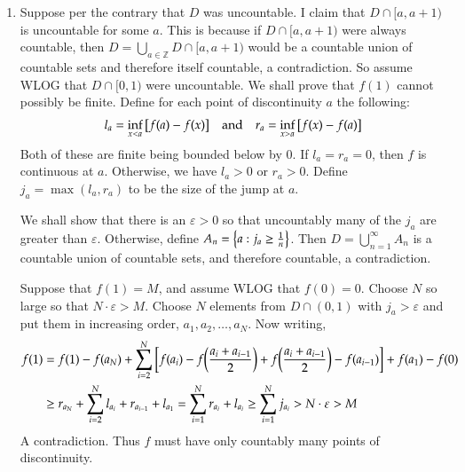 \documentclass[12pt]{article}
\theoremstyle{definitionstyle}
\def\mbb#1{\mathbb{#1}}
\def\ve{\varepsilon}
\newcommand{\SET}[1]{\Set{\mskip-\medmuskip #1 \mskip-\medmuskip}}
\newcommand{\Z}{\mbb Z}
\newcommand{\1}{\mathds 1}
\begin{document}
\begin{enumerate}
        \item Suppose per the contrary that $D$ was uncountable. I claim that $D \cap [a, a+1)$ is uncountable for some $a$. This is because if $D \cap [a, a+1)$ were always countable, then $D = \bigcup_{a \in \Z} D \cap [a, a+1)$ would be a countable union of countable sets and therefore itself countable, a contradiction. So assume WLOG that $D \cap [0,1)$ were uncountable. We shall prove that $f(1)$ cannot possibly be finite. Define for each point of discontinuity $a$ the following:
        \begin{align*}
            l_a = \inf_{x < a} \qty[f(a) - f(x)] \quad \text{and} \quad r_a = \inf_{x > a} \qty[f(x) - f(a)]
        \end{align*}
        Both of these are finite being bounded below by $0$. If $l_a = r_a = 0$, then $f$ is continuous at $a$. Otherwise, we have $l_a > 0$ or $r_a > 0$. Define $j_a = \max(l_a, r_a)$ to be the size of the jump at $a$. 

        We shall show that there is an $\ve > 0$ so that uncountably many of the $j_a$ are greater than $\ve$. Otherwise, define $A_n = \SET{a : j_a \geq \frac 1n}$. Then $D = \bigcup_{n=1}^\infty A_n$ is a countable union of countable sets, and therefore countable, a contradiction. 

        Suppose that $f(1) = M$, and assume WLOG that $f(0)=0$. Choose $N$ so large so that $N \cdot \ve > M$. Choose $N$ elements from $D \cap (0, 1)$ with $j_a > \ve$ and put them in increasing order, $a_1, a_2, \ldots, a_N$. Now writing,
        \begin{align*}
            f(1) &= f(1) - f(a_N) + \sum_{i=2}^N \qty[f(a_i) - f\qty(\frac{a_i + a_{i-1}}2) + f\qty(\frac{a_i + a_{i-1}}2) - f(a_{i-1})] + f(a_1) - f(0) \\
            &\geq r_{a_N} + \sum_{i=2}^N l_{a_i} + r_{a_{i-1}} + l_{a_1} = \sum_{i=1}^N r_{a_i} + l_{a_i} \geq \sum_{i=1}^N j_{a_i} > N \cdot \ve > M
        \end{align*}
        A contradiction. Thus $f$ must have only countably many points of discontinuity.


\end{enumerate}
\end{document}
